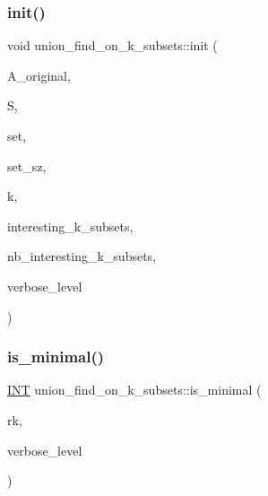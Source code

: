 \subsubsection{\texorpdfstring{init()}{init()}}
{\footnotesize\ttfamily void union\+\_\+find\+\_\+on\+\_\+k\+\_\+subsets\+::init (\begin{DoxyParamCaption}\item[{\mbox{\hyperlink{classaction}{action}} $\ast$}]{A\+\_\+original,  }\item[{\mbox{\hyperlink{classsims}{sims}} $\ast$}]{S,  }\item[{\mbox{\hyperlink{galois_8h_a09fddde158a3a20bd2dcadb609de11dc}{I\+NT}} $\ast$}]{set,  }\item[{\mbox{\hyperlink{galois_8h_a09fddde158a3a20bd2dcadb609de11dc}{I\+NT}}}]{set\+\_\+sz,  }\item[{\mbox{\hyperlink{galois_8h_a09fddde158a3a20bd2dcadb609de11dc}{I\+NT}}}]{k,  }\item[{\mbox{\hyperlink{galois_8h_a09fddde158a3a20bd2dcadb609de11dc}{I\+NT}} $\ast$}]{interesting\+\_\+k\+\_\+subsets,  }\item[{\mbox{\hyperlink{galois_8h_a09fddde158a3a20bd2dcadb609de11dc}{I\+NT}}}]{nb\+\_\+interesting\+\_\+k\+\_\+subsets,  }\item[{\mbox{\hyperlink{galois_8h_a09fddde158a3a20bd2dcadb609de11dc}{I\+NT}}}]{verbose\+\_\+level }\end{DoxyParamCaption})}

\mbox{\label{classunion__find__on__k__subsets_aaccc96b763e0af9bf15d24705ea0f3f1}} 
\subsubsection{\texorpdfstring{is\+\_\+minimal()}{is\_minimal()}}
{\footnotesize\ttfamily \mbox{\hyperlink{galois_8h_a09fddde158a3a20bd2dcadb609de11dc}{I\+NT}} union\+\_\+find\+\_\+on\+\_\+k\+\_\+subsets\+::is\+\_\+minimal (\begin{DoxyParamCaption}\item[{\mbox{\hyperlink{galois_8h_a09fddde158a3a20bd2dcadb609de11dc}{I\+NT}}}]{rk,  }\item[{\mbox{\hyperlink{galois_8h_a09fddde158a3a20bd2dcadb609de11dc}{I\+NT}}}]{verbose\+\_\+level }\end{DoxyParamCaption})}

